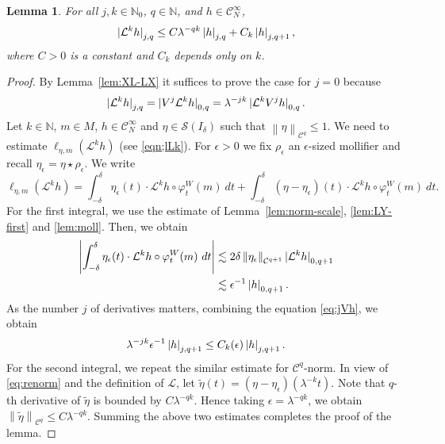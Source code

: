 \documentclass[a4paper,11pt]{amsart}
\newtheorem{lemma}[theorem]{Lemma}
\theoremstyle{remark}
\newcommand{\abs}[1]{\left|#1\right|} %
\newcommand{\cC}{\mathcal{C}} %
\newcommand{\cS}{\mathcal{S}} %
\newcommand{\cL}{\mathcal{L}} %
\newcommand{\bN}{\mathbb{N}} %
\newcommand{\norm}[1]{\left\|#1\right\|} %
\newcommand{\snorm}[1]{\left|#1\right|} %
\newcommand{\dv}{V} %
\newcommand{\dw}{W} %
\begin{document}
\begin{lemma}
    \label{lem:LY-other}
    For all \(j,k \in \bN_0\), \(q \in \bN\), and \(h\in \cC^{\infty}_{N}\),
    \[
        \snorm{\smash{\cL^k h}}_{j,q}
        \leq
        C \lambda^{-qk} \snorm{h}_{j,q} +
        C_k  \snorm{h}_{j,q+1},
    \]
    where \(C>0\) is a constant and \(C_k\) depends only on \(k\).
\end{lemma}

\begin{proof}
    By Lemma~\ref{lem:XL-LX} it suffices to prove the case for \(j=0\) because 
    \begin{equation}
        \label{eq:jVh}
        \snorm{\smash{\cL^k h}}_{j,q} = \snorm{\smash{\dv^j \cL^k h}}_{0,q} = \lambda^{-jk} \snorm{\smash{\cL^k \dv^j h}}_{0,q}.
    \end{equation}
    Let \(k\in\bN\), \(m\in M\),
    \(h\in \cC^{\infty}_{N}\)
    and \(\eta \in \cS(I_{\delta})\) such that \(  \norm{\eta}_{\cC^{q}}\leq 1\).
    We need to estimate $\ell_{\eta,m}(\cL^k h)$ (see \eqref{eqn;lLk}).
    For \(\epsilon > 0\) we fix \(\rho_{\epsilon}\) an \(\epsilon\)-sized mollifier and recall \(\eta_{\epsilon}= \eta \star \rho_{\epsilon}\).
    We write
    \[
        \ell_{\eta,m}(\cL^k h)
        = \int_{-\delta}^{\delta} \eta_{\epsilon}(t) \cdot \cL^k h\circ \varphi_{t}^{\dw}(m) \ dt
        + \int_{-\delta}^{\delta} \left(\eta - \eta_{\epsilon}\right)(t) \cdot \cL^k h\circ \varphi_{t}^{\dw}(m) \ dt.
    \]
    For the first integral, we use the estimate of Lemma~\ref{lem:norm-scale}, \ref{lem:LY-first} and \ref{lem:moll}. Then, we obtain 
    \[
        \begin{aligned}
        \abs{\int_{-\delta}^{\delta} \eta_{\epsilon}(t) \cdot \cL^k h\circ \varphi_{t}^{\dw}(m) \ dt}
        &\lesssim 2\delta \norm{\eta_{\epsilon}}_{\cC^{q+1}}  \abs{\smash{\cL^k h}}_{0,q+1}\\
        &\lesssim \epsilon^{-1} \abs{\smash{ h}}_{0,q+1}.
    \end{aligned}
    \]
    As the number $j$ of derivatives matters, combining the equation \eqref{eq:jVh}, we obtain
    $$
    \lambda^{-jk}\epsilon^{-1} \abs{\smash{ h}}_{j,q+1} \leq C_k(\epsilon)\abs{\smash{ h}}_{j,q+1}.
    $$ 
    For the second integral, we repeat the similar estimate for $\cC^{q}$-norm.
    In view of \eqref{eq:renorm} and the definition of $\cL$,
    let \(\tilde{\eta}(t) = \left(\eta - \eta_{\epsilon}\right)(\lambda^{-k}t)\). Note that $q$-th derivative of $\tilde{\eta}$ is bounded by $C\lambda^{-qk}$. Hence taking \(\epsilon = \lambda^{-qk}\), we obtain $\norm{\tilde \eta}_{\cC^q} \leq C\lambda^{-qk}$.
    Summing the above two estimates completes the proof of the lemma.
\end{proof}
\end{document}
